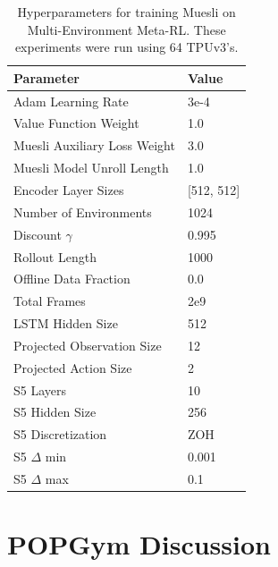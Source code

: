 \documentclass{article}
\begin{document}
\begin{table}[h]
\centering
\caption{Hyperparameters for training Muesli on Multi-Environment Meta-RL. These experiments were run using 64 TPUv3's.}
\label{tab:meta-params}
\begin{tabular}{l|l}
Parameter & Value \\ \hline
Adam Learning Rate & 3e-4 \\
Value Function Weight & 1.0 \\ 
Muesli Auxiliary Loss Weight & 3.0 \\
Muesli Model Unroll Length & 1.0 \\
Encoder Layer Sizes & [512, 512] \\
Number of Environments & 1024 \\
Discount $\gamma$ & 0.995 \\
Rollout Length & 1000 \\
Offline Data Fraction & 0.0 \\
Total Frames & 2e9 \\ 
LSTM Hidden Size & 512 \\
Projected Observation Size & 12 \\
Projected Action Size & 2 \\
S5 Layers & 10 \\
S5 Hidden Size & 256 \\
S5 Discretization & ZOH \\
S5 $\Delta$ min & 0.001 \\
S5 $\Delta$ max & 0.1 \\
\end{tabular}
\end{table}

\newpage

\section{POPGym Discussion}
\label{app:popgym}
\end{document}
